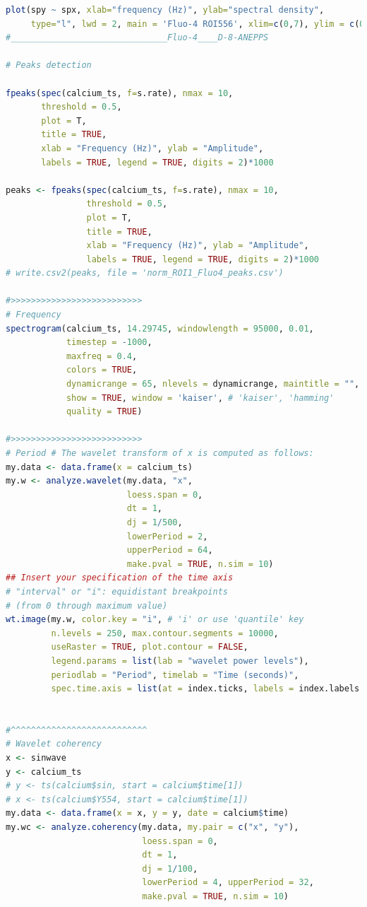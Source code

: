 \documentclass{biophys-new}
\begin{document}
\begin{lstlisting}[language=R]
plot(spy ~ spx, xlab="frequency (Hz)", ylab="spectral density",
     type="l", lwd = 2, main = 'Fluo-4 ROI556', xlim=c(0,7), ylim = c(0, 1))
#_______________________________Fluo-4____D-8-ANEPPS

# Peaks detection

fpeaks(spec(calcium_ts, f=s.rate), nmax = 10,
       threshold = 0.5,
       plot = T,
       title = TRUE,
       xlab = "Frequency (Hz)", ylab = "Amplitude",
       labels = TRUE, legend = TRUE, digits = 2)*1000

peaks <- fpeaks(spec(calcium_ts, f=s.rate), nmax = 10,
                threshold = 0.5,
                plot = T,
                title = TRUE,
                xlab = "Frequency (Hz)", ylab = "Amplitude",
                labels = TRUE, legend = TRUE, digits = 2)*1000
# write.csv2(peaks, file = 'norm_ROI1_Fluo4_peaks.csv')

#>>>>>>>>>>>>>>>>>>>>>>>>>>
# Frequency
spectrogram(calcium_ts, 14.29745, windowlength = 95000, 0.01,
            timestep = -1000,
            maxfreq = 0.4,
            colors = TRUE,
            dynamicrange = 65, nlevels = dynamicrange, maintitle = "",
            show = TRUE, window = 'kaiser', # 'kaiser', 'hamming'
            quality = TRUE)

#>>>>>>>>>>>>>>>>>>>>>>>>>>
# Period # The wavelet transform of x is computed as follows:
my.data <- data.frame(x = calcium_ts)
my.w <- analyze.wavelet(my.data, "x",
                        loess.span = 0,
                        dt = 1,
                        dj = 1/500,
                        lowerPeriod = 2,
                        upperPeriod = 64,
                        make.pval = TRUE, n.sim = 10)
## Insert your specification of the time axis
# "interval" or "i": equidistant breakpoints
# (from 0 through maximum value)
wt.image(my.w, color.key = "i", # 'i' or use 'quantile' key
         n.levels = 250, max.contour.segments = 10000,
         useRaster = TRUE, plot.contour = FALSE,
         legend.params = list(lab = "wavelet power levels"),
         periodlab = "Period", timelab = "Time (seconds)",
         spec.time.axis = list(at = index.ticks, labels = index.labels.rounded))


#^^^^^^^^^^^^^^^^^^^^^^^^^^^
# Wavelet coherency
x <- sinwave
y <- calcium_ts
# y <- ts(calcium$sin, start = calcium$time[1])
# x <- ts(calcium$Y554, start = calcium$time[1])
my.data <- data.frame(x = x, y = y, date = calcium$time)
my.wc <- analyze.coherency(my.data, my.pair = c("x", "y"),
                           loess.span = 0,
                           dt = 1,
                           dj = 1/100,
                           lowerPeriod = 4, upperPeriod = 32,
                           make.pval = TRUE, n.sim = 10)


\end{lstlisting}
\end{document}
